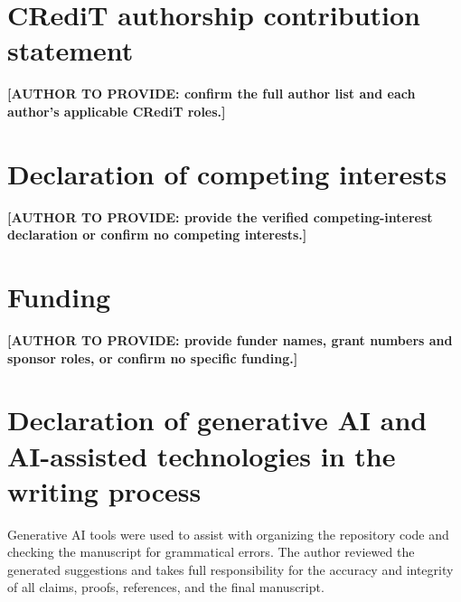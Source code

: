 \documentclass[a4paper,fleqn]{cas-sc}
\newcommand{\authoraction}[1]{\textbf{[AUTHOR TO PROVIDE: #1]}}
\begin{document}
\section*{CRediT authorship contribution statement}
\authoraction{confirm the full author list and each author's applicable CRediT roles.}

\section*{Declaration of competing interests}
\authoraction{provide the verified competing-interest declaration or confirm no competing interests.}

\section*{Funding}
\authoraction{provide funder names, grant numbers and sponsor roles, or confirm no specific funding.}

\section*{Declaration of generative AI and AI-assisted technologies in the writing process}
Generative AI tools were used to assist with organizing the repository code and checking the manuscript for grammatical errors. The author reviewed the generated suggestions and takes full responsibility for the accuracy and integrity of all claims, proofs, references, and the final manuscript.



\end{document}
